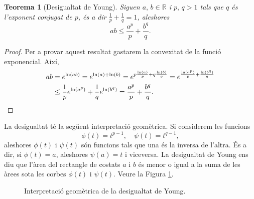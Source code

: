 \documentclass[12pt]{book}
\newtheorem{teorema}{Teorema}[chapter]
\theoremstyle{definition}
\theoremstyle{nota}
\theoremstyle{exemple}
\begin{document}
\begin{teorema}[Desigualtat de Young]
  Siguen $a,\, b \in \mathbb{R}$ i $p,\, q > 1$ tals que $q$ és
  l'exponent conjugat de $p$, és a dir
  $\frac{1}{p} + \frac{1}{q} = 1$, aleshores
  \[
    ab \leq \frac{a^p}{p} + \frac{b^q}{q}.
  \]
\end{teorema}

\begin{proof}
  Per a provar aquest resultat gastarem la convexitat de la funció
  exponencial. Així,
  \begin{align*}
    ab &= e^{\ln(ab)} = e^{\ln(a) + \ln(b)}
         = e^{p \frac{\ln(a)}{p} + q \frac{\ln(b)}{q}}
         = e^{\frac{\ln(a^p)}{p}+\frac{\ln(b^q)}{q}} \\
       &\leq \frac{1}{p} e^{\ln(a^p)} + \frac{1}{q} e^{\ln(b^q)}
         = \frac{a^p}{p} + \frac{b^q}{q}.\qedhere
  \end{align*}
\end{proof}

La desigualtat té la següent interpretació geomètrica. Si considerem
les funcions
\[
  \phi(t) = t^{p-1}, \quad \psi(t) = t^{q-1},
\]
aleshores $\phi(t)$ i $\psi(t)$ són funcions tals que una és la
inversa de l'altra. És a dir, si $\phi(t) = a$, aleshores
$\psi(a) = t$ i viceversa. La desigualtat de Young ens diu que l'àrea
del rectangle de costats $a$ i $b$ és menor o igual a la suma de les
àrees sota les corbes $\phi(t)$ i $\psi(t)$. Veure la Figura
\ref{fig:young}.

\begin{figure}[hbtp]
  \centering
  \caption{Interpretació geomètrica de la desigualtat de Young.}
  \label{fig:young}
\end{figure}
\end{document}
